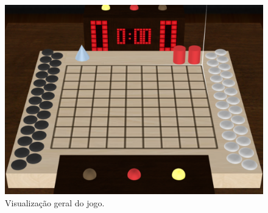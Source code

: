 \documentclass[a4paper]{article}
\begin{document}
\begin{figure}[p]
\begin{center}
\includegraphics[scale=0.4]{images/screenshot.png}
\caption{Visualização geral do jogo.}
\end{center}
\end{figure}

\newpage
\end{document}
